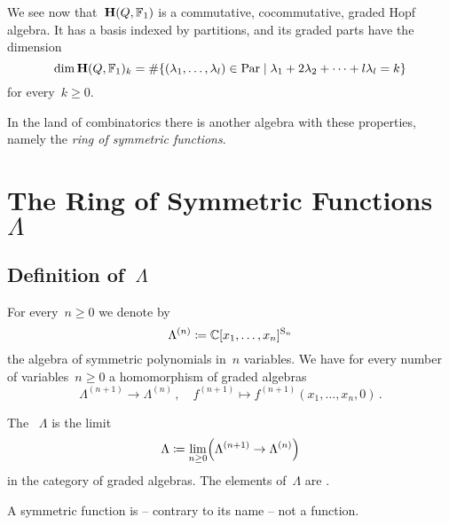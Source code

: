 \documentclass[a4paper, 11pt, twoside=semi]{scrartcl}
\begin{document}
We see now that~$\mathbf{H}(Q, \mathbb{F}_1)$ is a commutative, cocommutative, graded Hopf algebra.
It has a basis indexed by partitions, and its graded parts have the dimension
\[
  \dim \Hall(Q, \Finite_1)_k
  =
  \counting
  \{
    (\lambda_1, \dotsc, \lambda_l) \in \Par
  \suchthat
    \lambda_1 + 2 \lambda_2 + \dotsb + l \lambda_l = k
  \}
\]
for every~$k \geq 0$.

In the land of combinatorics there is another algebra with these properties, namely the \emph{ring of symmetric functions}.





\section{The Ring of Symmetric Functions~$\Lambda$}



\subsection{Definition of~$\Lambda$}

For every~$n \geq 0$ we denote by
\[
  \Lambda^{(n)}
  \coloneqq
  \mathbb{C}[x_1, \dotsc, x_n]^{\mathrm{S}_n}
\]
the algebra of symmetric polynomials in~$n$ variables.
We have for every number of variables~$n \geq 0$ a homomorphism of graded algebras
\[
  \Lambda^{(n+1)} \to \Lambda^{(n)} \,,
  \quad
  f^{(n+1)}
  \mapsto
  f^{(n+1)}(x_1, \dotsc, x_n, 0) \,.
\]

\begin{definition}
  The ~$\Lambda$ is the limit
  \[
    \Lambda
    \coloneqq
    \lim_{n \geq 0}
    \Bigl( \Lambda^{(n+1)} \to \Lambda^{(n)} \Bigr)
  \]
  in the category of graded algebras.
  The elements of~$\Lambda$ are .
\end{definition}

\begin{warning}
  A symmetric function is -- contrary to its name -- not a function.
\end{warning}
\end{document}
